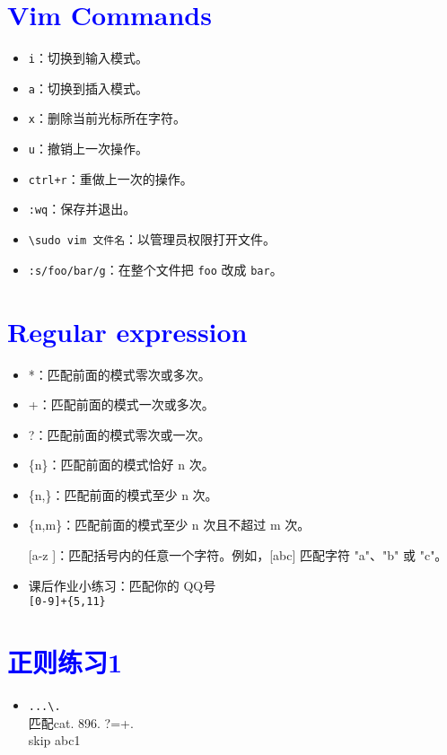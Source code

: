 \documentclass{article}
\begin{document}
\section{\textcolor{blue}{Vim Commands}}
\begin{itemize}
\begin{figure}[htbp]
    \centering
    \texttt{[image: picturevim.png]}
    \caption{Elliptic Paraboloid}
    \end{figure} 
    \item \texttt{i}：切换到输入模式。
    \item \texttt{a}：切换到插入模式。
    \item \texttt{x}：删除当前光标所在字符。
    \item \texttt{u}：撤销上一次操作。
    \item \texttt{ctrl+r}：重做上一次的操作。
    \item \texttt{:wq}：保存并退出。
    \item \texttt{\textbackslash sudo vim 文件名}：以管理员权限打开文件。
    \item \texttt{:s/foo/bar/g}：在整个文件把 \texttt{foo} 改成 \texttt{bar}。
\end{itemize}
\section{\textcolor{blue}{Regular expression}}
\begin{itemize}
  \item *：匹配前面的模式零次或多次。
  \item +：匹配前面的模式一次或多次。
  \item?：匹配前面的模式零次或一次。
  \item \{n\}：匹配前面的模式恰好 n 次。
  \item \{n,\}：匹配前面的模式至少 n 次。
  \item \{n,m\}：匹配前面的模式至少 n 次且不超过 m 次。
  \item [[a-z]]：匹配括号内的任意一个字符。例如，[abc] 匹配字符 "a"、"b" 或 "c"。 
  \item 课后作业小练习：匹配你的 QQ号 \\ \texttt{[0-9]+\{5,11\}}
\end{itemize}

\section{\textcolor{blue}{正则练习1}}
\begin{itemize}
\item \verb|...\.| \\ 匹配cat. 896. ?=+. \\skip abc1
\end{itemize}
\end{document}
